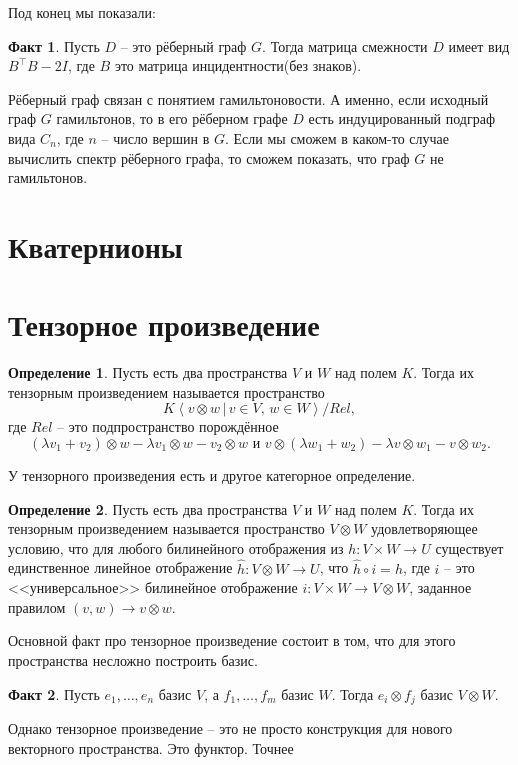 \documentclass[10pt,a4paper,oneside]{book}
\theoremstyle{definition}
\newtheorem{defn}{Определение}
\newtheorem*{fact}{Факт}
\def\lan{\left\langle }
\def\ran{\right\rangle}
\def\dfn{\begin{defn}}
\def\edfn{\end{defn}}
\def\fct{\begin{fact}}
\def\efct{\end{fact}}
\begin{document}
Под конец мы показали:

\fct Пусть $D$ -- это рёберный граф $G$. Тогда матрица смежности $D$ имеет вид $B^{\top}B -2I$, где $B$ это матрица инцидентности(без знаков). 
\efct

Рёберный граф связан с понятием гамильтоновости. А именно, если исходный граф $G$ гамильтонов, то в его рёберном графе $D$ есть индуцированный подграф вида $C_n$, где $n$ -- число вершин в $G$. Если мы сможем в каком-то случае вычислить спектр рёберного графа, то сможем показать, что граф $G$ не гамильтонов.







\section{Кватернионы}

\section{Тензорное произведение}

\dfn Пусть есть два пространства $V$ и $W$ над полем $K$. Тогда их тензорным произведением называется пространство 
$$K\lan v\otimes w \,|\, v\in V,\, w\in W \ran / Rel,$$
где $Rel$ -- это подпространство порождённое 
$$(\lambda v_1+v_2)\otimes w - \lambda v_1\otimes w - v_2 \otimes w \text{ и } v\otimes(\lambda w_1+ w_2) - \lambda v\otimes w_1 - v\otimes w_2.$$ 
\edfn 

У тензорного произведения есть и другое категорное определение. 
\dfn  Пусть есть два пространства $V$ и $W$ над полем $K$. Тогда их тензорным произведением называется пространство $V\otimes W$ удовлетворяющее условию, что для любого билинейного отображения из $h\colon V\times W \to U$ существует единственное линейное отображение $\hat{h}\colon V\otimes W \to U$, что $\hat{h}\circ i=h$, где $i$ -- это <<универсальное>> билинейное отображение $i\colon V\times W \to V\otimes W$, заданное правилом $(v,w) \to v\otimes w$.
\edfn

Основной факт про тензорное произведение состоит в том, что для этого пространства несложно построить базис.
\fct Пусть $e_1,\dots,e_n$ базис $V$, а $f_1,\dots, f_m $ базис $W$. Тогда $e_i\otimes f_j$ базис $V\otimes W$.
\efct

Однако тензорное произведение -- это не просто конструкция для нового векторного пространства. Это функтор. Точнее
\end{document}
